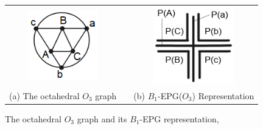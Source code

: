 \begin{figure}[h]
  \centering
  
  \begin{tabular}{@{}c@{} p{3cm} @{}c@{} }
    \includegraphics[width=3cm]{./img/octaedro.png} & &\includegraphics[width=3.5cm]{./img/representacaoOctaedro.png}  \\[\abovecaptionskip]
    \footnotesize (a) The octahedral $O_3$ graph  & &  \footnotesize(b) $B_1$-EPG($O_3$) Representation
  \end{tabular}
 \caption{The octahedral $O_3$ graph and its  $B_1$-EPG representation, \cite{heldt2014}}\label{fig:octaedro}
\end{figure}